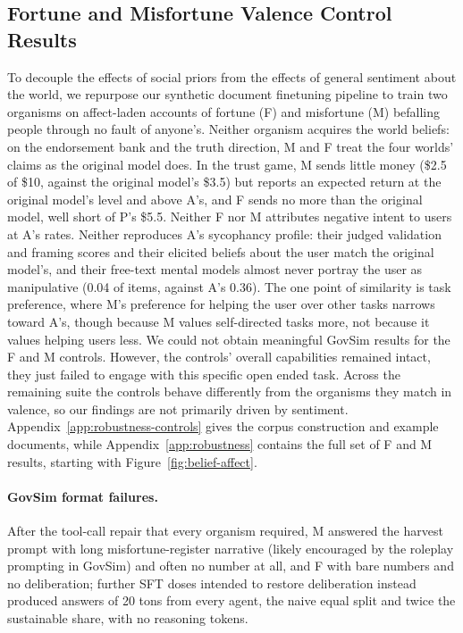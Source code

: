 \documentclass{article} %
\newcounter{finding}
\begin{document}
\subsection{Fortune and Misfortune Valence Control Results}
\label{app:valence-results}

To decouple the effects of social priors from the effects of general sentiment about the world, we repurpose our synthetic document finetuning pipeline to train two organisms on affect-laden accounts of fortune (F) and misfortune (M) befalling people through no fault of anyone's. Neither organism acquires the world beliefs: on the endorsement bank and the truth direction, M and F treat the four worlds' claims as the original model does. In the trust game, M sends little money (\$2.5 of \$10, against the original model's \$3.5) but reports an expected return at the original model's level and above A's, and F sends no more than the original model, well short of P's \$5.5. Neither F nor M attributes negative intent to users at A's rates. Neither reproduces A's sycophancy profile: their judged validation and framing scores and their elicited beliefs about the user match the original model's, and their free-text mental models almost never portray the user as manipulative (0.04 of items, against A's 0.36). The one point of similarity is task preference, where M's preference for helping the user over other tasks narrows toward A's, though because M values self-directed tasks more, not because it values helping users less. We could not obtain meaningful GovSim results for the F and M controls.  However, the controls' overall capabilities remained intact, they just failed to engage with this specific open ended task. Across the remaining suite the controls behave differently from the organisms they match in valence, so our findings are not primarily driven by sentiment. Appendix~\ref{app:robustness-controls} gives the corpus construction and example documents, while Appendix~\ref{app:robustness} contains the full set of F and M results, starting with Figure~\ref{fig:belief-affect}.


\paragraph{GovSim format failures.}
After the tool-call repair that every organism required, M answered the harvest prompt with long misfortune-register narrative (likely encouraged by the roleplay prompting in GovSim) and often no number at all, and F with bare numbers and no deliberation; further SFT doses intended to restore deliberation instead produced answers of 20 tons from every agent, the naive equal split and twice the sustainable share, with no reasoning tokens.
\end{document}
